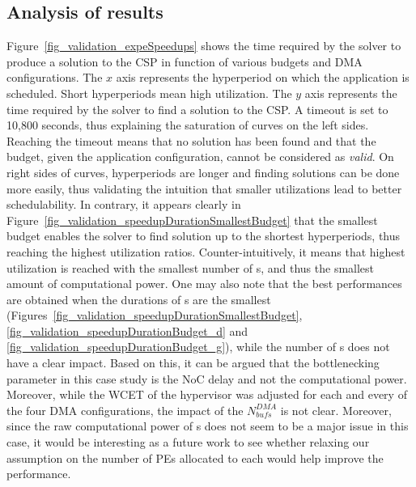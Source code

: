 \documentclass[main.tex]{subfiles}
\begin{document}
\subsection{Analysis of results}
Figure~\ref{fig_validation_expeSpeedups} shows the time required by the solver to produce a solution to the CSP in function of various budgets and DMA configurations. The $x$ axis represents the hyperperiod on which the application is scheduled. Short hyperperiods mean high utilization. The $y$ axis represents the time required by the solver to find a solution to the CSP. A timeout is set to 10,800 seconds, thus explaining the saturation of curves on the left sides. Reaching the timeout means that no solution has been found and that the budget, given the application configuration, cannot be considered as \emph{valid}. On right sides of curves, hyperperiods are longer and finding solutions can be done more easily, thus validating the intuition that smaller utilizations lead to better schedulability.
In contrary, it appears clearly in Figure~\ref{fig_validation_speedupDurationSmallestBudget} that the smallest budget enables the solver to find solution up to the shortest hyperperiods, thus reaching the highest utilization ratios. Counter-intuitively, it means that highest utilization is reached with the smallest number of \PN{}s, and thus the smallest amount of computational power. One may also note that the best performances are obtained when the durations of \PC{}s are the smallest (Figures~\ref{fig_validation_speedupDurationSmallestBudget}, \ref{fig_validation_speedupDurationBudget_d} and \ref{fig_validation_speedupDurationBudget_g}), while the number of \PN{}s does not have a clear impact. Based on this, it can be argued that the bottlenecking parameter in this case study is the NoC delay and not the computational power. Moreover, while the WCET of the hypervisor was adjusted for each and every of the four DMA configurations, the impact of the $N_{bufs}^{DMA}$ is not clear. Moreover, since the raw computational power of \PN{}s does not seem to be a major issue in this case, it would be interesting as a future work to see whether relaxing our assumption on the number of PEs allocated to each \PN{} would help improve the performance. 
\end{document}

